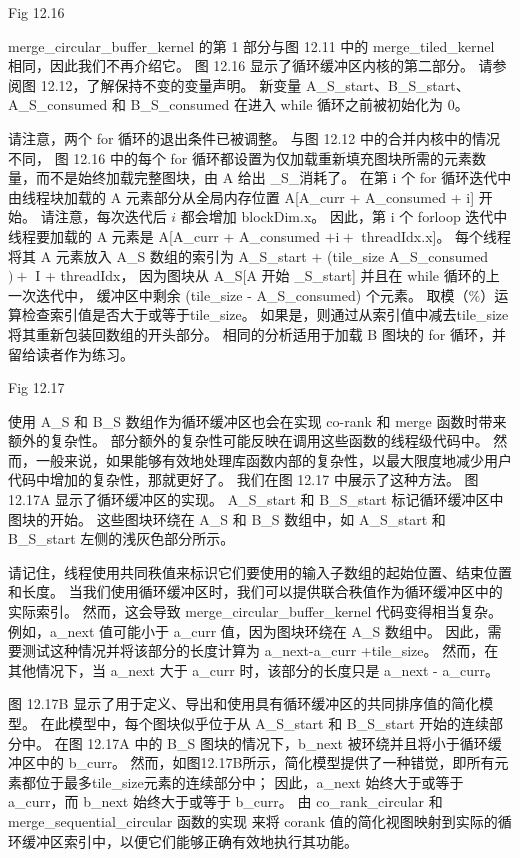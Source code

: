 {\color{red} Fig 12.16}

merge\_circular\_buffer\_kernel 的第 1 部分与图 12.11 中的 merge\_tiled\_kernel 相同，因此我们不再介绍它。 
图 12.16 显示了循环缓冲区内核的第二部分。 请参阅图 12.12，了解保持不变的变量声明。 
新变量 A\_S\_start、B\_S\_start、A\_S\_consumed 和 B\_S\_consumed 在进入 while 循环之前被初始化为 0。

请注意，两个 for 循环的退出条件已被调整。 与图 12.12 中的合并内核中的情况不同，
图 12.16 中的每个 for 循环都设置为仅加载重新填充图块所需的元素数量，而不是始终加载完整图块，由 A 给出 \_S\_消耗了。 
在第 i 个 for 循环迭代中由线程块加载的 A 元素部分从全局内存位置 A[A\_curr + A\_consumed + i] 开始。 
请注意，每次迭代后 $i$ 都会增加 blockDim.x。 
因此，第 i 个 forloop 迭代中线程要加载的 A 元素是 A[A\_curr + A\_consumed $+\mathrm{i}+$ threadIdx.x]。 
每个线程将其 A 元素放入 A\_S 数组的索引为 A\_S\_start + (tile\_size A\_S\_consumed $)+$ I + threadIdx，
因为图块从 A\_S[A 开始 \_S\_start] 并且在 while 循环的上一次迭代中，
缓冲区中剩余 (tile\_size - A\_S\_consumed) 个元素。 取模（\%）运算检查索引值是否大于或等于tile\_size。 
如果是，则通过从索引值中减去tile\_size 将其重新包装回数组的开头部分。 
相同的分析适用于加载 B 图块的 for 循环，并留给读者作为练习。

{\color{red} Fig 12.17}

使用 A\_S 和 B\_S 数组作为循环缓冲区也会在实现 co-rank 和 merge 函数时带来额外的复杂性。 
部分额外的复杂性可能反映在调用这些函数的线程级代码中。 
然而，一般来说，如果能够有效地处理库函数内部的复杂性，以最大限度地减少用户代码中增加的复杂性，那就更好了。 
我们在图 12.17 中展示了这种方法。 图 12.17A 显示了循环缓冲区的实现。 
A\_S\_start 和 B\_S\_start 标记循环缓冲区中图块的开始。 
这些图块环绕在 A\_S 和 B\_S 数组中，如 A\_S\_start 和 B\_S\_start 左侧的浅灰色部分所示。

请记住，线程使用共同秩值来标识它们要使用的输入子数组的起始位置、结束位置和长度。 
当我们使用循环缓冲区时，我们可以提供联合秩值作为循环缓冲区中的实际索引。 
然而，这会导致 merge\_circular\_buffer\_kernel 代码变得相当复杂。 
例如，a\_next 值可能小于 a\_curr 值，因为图块环绕在 A\_S 数组中。 
因此，需要测试这种情况并将该部分的长度计算为 a\_next-a\_curr +tile\_size。 
然而，在其他情况下，当 a\_next 大于 a\_curr 时，该部分的长度只是 a\_next - a\_curr。

图 12.17B 显示了用于定义、导出和使用具有循环缓冲区的共同排序值的简化模型。 
在此模型中，每个图块似乎位于从 A\_S\_start 和 B\_S\_start 开始的连续部分中。 
在图 12.17A 中的 B\_S 图块的情况下，b\_next 被环绕并且将小于循环缓冲区中的 b\_curr。 
然而，如图12.17B所示，简化模型提供了一种错觉，即所有元素都位于最多tile\_size元素的连续部分中； 
因此，a\_next 始终大于或等于 a\_curr，而 b\_next 始终大于或等于 b\_curr。 
由 co\_rank\_circular 和 merge\_sequential\_circular 函数的实现
来将 corank 值的简化视图映射到实际的循环缓冲区索引中，以便它们能够正确有效地执行其功能。

